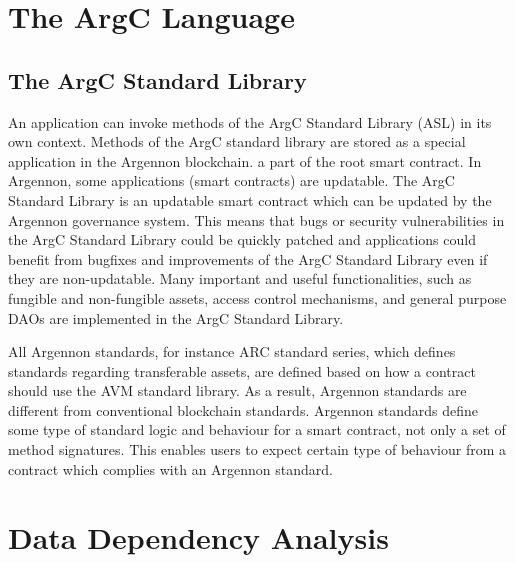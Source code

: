 \section{The ArgC Language}\label{sec:the-argc-language}

\subsection{The ArgC Standard Library}\label{sec:asl}

An application can invoke methods of the ArgC Standard Library (ASL) in its own context. Methods of the ArgC standard
library are stored as a special application in the Argennon blockchain.
a part of the root smart contract.
In Argennon, some applications (smart contracts) are updatable. The ArgC Standard Library is an updatable smart
contract which can be updated by the Argennon governance
system. This means that bugs or security vulnerabilities in the ArgC Standard Library could be quickly patched and
applications could benefit from bugfixes and improvements of the ArgC Standard Library even if they are
non-updatable. Many important and useful functionalities,
such as fungible and non-fungible assets, access control mechanisms,
and general purpose DAOs are implemented in the ArgC Standard Library.

All Argennon standards, for instance ARC standard series, which defines standards regarding transferable assets,
are defined based on how a contract should use the AVM standard library. As a result, Argennon standards are
different from conventional blockchain standards. Argennon standards define some type of standard logic and
behaviour for a smart contract, not only a set of method signatures. This enables users to expect certain type
of behaviour from a contract which complies with an Argennon standard.


\section{Data Dependency Analysis}\label{sec:concurrency}
